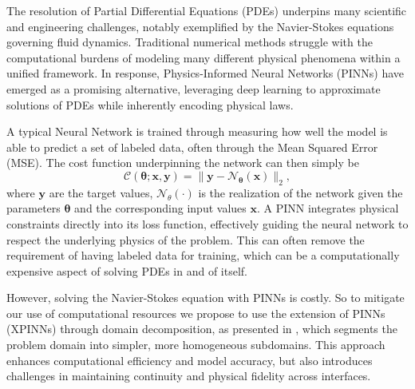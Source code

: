 The resolution of Partial Differential Equations (PDEs) underpins %
many scientific and engineering challenges, notably exemplified by the Navier-Stokes equations governing fluid dynamics. Traditional numerical methods struggle with the computational burdens of modeling many different physical phenomena within a unified framework. In response, Physics-Informed Neural Networks (PINNs) have emerged as a promising alternative, leveraging deep learning to approximate solutions of PDEs while inherently encoding physical laws.

A typical Neural Network is trained through measuring how well the model is able to predict a set of labeled data, often through the Mean Squared Error (MSE). The cost function underpinning the network can then simply be
\begin{equation}
    \mathcal{C}(\boldsymbol{\theta}; \boldsymbol{x}, \boldsymbol{y}) = \lVert \boldsymbol{y} - \mathcal{N}_{\boldsymbol{\theta}}(\boldsymbol{x}) \rVert_2,
\end{equation}
where $\boldsymbol{y}$ are the target values, $\mathcal{N}_\theta(\cdot)$ is the realization of the network given the parameters $\boldsymbol{\theta}$ and the corresponding input values $\boldsymbol{x}$. 
A PINN integrates physical constraints directly into its loss function, effectively guiding the neural network to respect the underlying physics of the problem. This can often remove the requirement of having labeled data for training, which can be a computationally expensive aspect of solving PDEs in and of itself.

\begin{comment}
PINNs build upon this idea, extending the cost function in order to integrate the physical laws governing the problem.
Consider a PDE on the domain $\Omega$ of the form
\begin{equation*}
    \mathcal{L}u^* = f \in \Omega \quad \text{and} \quad u^* = g \in \partial \Omega,
\end{equation*}
where $\mathcal{L}$ is the differential operator characterizing the PDE, $u^*$ is the unknown solution, and $\delta \Omega$ is the boundary. We approximate $u^*$ with $\mathcal{N}_\theta$ by appending
\begin{equation*}
    
\end{equation*}
\end{comment}


However, solving the Navier-Stokes equation with PINNs is costly. So to mitigate our use of computational resources we propose to use the extension of PINNs (XPINNs) through domain decomposition, as presented in \textcite{Jagtap2020ExtendedPN}, which segments the problem domain into simpler, more homogeneous subdomains. This approach enhances computational efficiency and model accuracy, but also introduces challenges in maintaining continuity and physical fidelity across interfaces.

